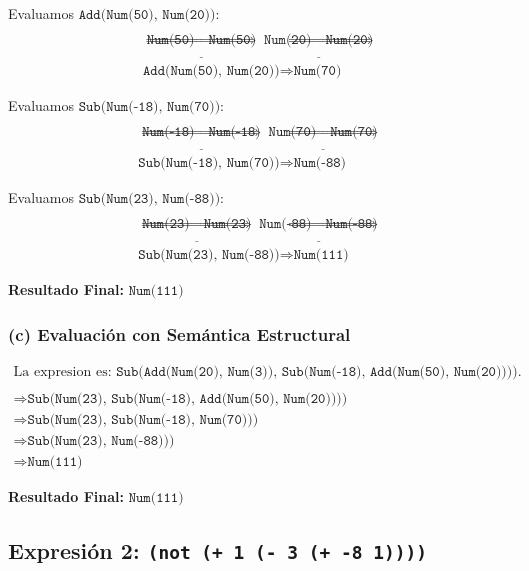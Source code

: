 \documentclass[12pt,letterpaper]{article}
\begin{document}
Evaluamos \(\texttt{Add(Num(50), Num(20))}\):
\[
\begin{array}{c}
\\
\underline{\texttt{Num(50)} \Rightarrow \texttt{Num(50)}} 
\underline{\texttt{Num(20)} \Rightarrow \texttt{Num(20)}} \\
\texttt{Add(Num(50), Num(20))} \Rightarrow \texttt{Num(70)}
\end{array}
\]

Evaluamos \(\texttt{Sub(Num(-18), Num(70))}\):
\[
\begin{array}{c}
\\
\underline{\texttt{Num(-18)} \Rightarrow \texttt{Num(-18)}}
\underline{\texttt{Num(70)} \Rightarrow \texttt{Num(70)}} \\
\texttt{Sub(Num(-18), Num(70))} \Rightarrow \texttt{Num(-88)}
\end{array}
\]

Evaluamos \(\texttt{Sub(Num(23), Num(-88))}\):
\[
\begin{array}{c}
\\
\underline{\texttt{Num(23)} \Rightarrow \texttt{Num(23)}}
\underline{\texttt{Num(-88)} \Rightarrow \texttt{Num(-88)}} \\
\texttt{Sub(Num(23), Num(-88))} \Rightarrow \texttt{Num(111)}
\end{array}
\]

\textbf{Resultado Final:} \(\texttt{Num(111)}\)

\subsubsection*{(c) Evaluación con Semántica Estructural}

\[
\begin{array}{c}
\text{La expresion es: } \texttt{Sub(Add(Num(20), Num(3)), Sub(Num(-18), Add(Num(50), Num(20))))}. \\
\\
\Rightarrow \texttt{Sub(Num(23), Sub(Num(-18), Add(Num(50), Num(20))))} \\
\Rightarrow \texttt{Sub(Num(23), Sub(Num(-18), Num(70)))} \\
\Rightarrow \texttt{Sub(Num(23), Num(-88)))} \\
\Rightarrow \texttt{Num(111)}

\end{array}
\]

\textbf{Resultado Final:} \(\texttt{Num(111)}\)

\subsection*{Expresión 2: \texttt{(not (+ 1 (- 3 (+ -8 1))))}}
\end{document}
